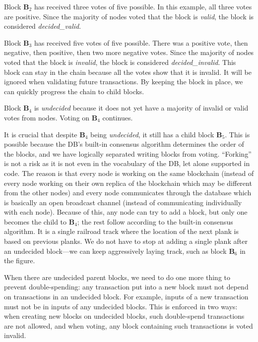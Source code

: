 Block $\mathbf{B}_2$ has received three votes of five possible.
In this example, all three votes are positive.
Since the majority of nodes voted that the block is \textsf{\textit{valid}}, the block is considered \textsf{\textit{decided\_valid}}.

Block $\mathbf{B}_3$ has received five votes of five possible.
There was a positive vote, then negative, then positive, then two more negative votes.
Since the majority of nodes voted that the block is \textsf{\textit{invalid}}, the block is considered \textsf{\textit{decided\_invalid}}.
This block can stay in the chain because all the votes show that it is invalid.
It will be ignored when validating future transactions.
By keeping the block in place, we can quickly progress the chain to child blocks.

Block $\mathbf{B}_4$ is \textsf{\textit{undecided}} because it does not yet have a majority of invalid or valid votes from nodes.
Voting on $\mathbf{B}_4$ continues.

It is crucial that despite $\mathbf{B}_4$ being \textsf{\textit{undecided}}, it still has a child block $\mathbf{B}_5$.
This is possible because the DB’s built-in consensus algorithm determines the order of the blocks, and we have logically separated writing blocks from voting.
“Forking” is not a risk as it is not even in the vocabulary of the DB, let alone supported in code.
The reason is that every node is working on the same blockchain (instead of every node working on their own replica of the blockchain which may be different from the other nodes) and every node communicates through the database which is basically an open broadcast channel (instead of communicating individually with each node).
Because of this, any node can try to add a block, but only one becomes the child to $\mathbf{B}_4$; the rest follow according to the built-in consensus algorithm.
It is a single railroad track where the location of the next plank is based on previous planks.
We do not have to stop at adding a single plank after an undecided block—we can keep aggressively laying track, such as block $\mathbf{B}_6$ in the figure.

When there are undecided parent blocks, we need to do one more thing to prevent double-spending: any transaction put into a new block must not depend on transactions in an undecided block.
For example, inputs of a new transaction must not be in inputs of any undecided blocks.
This is enforced in two ways: when creating new blocks on undecided blocks, such double-spend transactions are not allowed, and when voting, any block containing such transactions is voted invalid.

